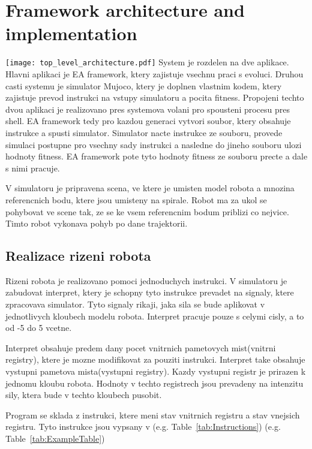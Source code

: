 \documentclass{ExcelAtFIT}
\begin{document}

\section{Framework architecture and implementation}
\label{sec:ArchitectureAndImplementation}
{\texttt{[image: top\_level\_architecture.pdf]}
System je rozdelen na dve aplikace.
Hlavni aplikaci je EA framework, ktery zajistuje vsechnu praci s evoluci.
Druhou casti systemu je simulator Mujoco, ktery je doplnen vlastnim kodem, ktery zajistuje prevod instrukci na vstupy simulatoru a pocita fitness.
Propojeni techto dvou aplikaci je realizovano pres systemova volani pro spousteni procesu pres shell.
EA framework tedy pro kazdou generaci vytvori soubor, ktery obsahuje instrukce a spusti simulator.
Simulator nacte instrukce ze souboru, provede simulaci postupne pro vsechny sady instrukci a nasledne do jineho souboru ulozi hodnoty fitness.
EA framework pote tyto hodnoty fitness ze souboru precte a dale s nimi pracuje.

V simulatoru je pripravena scena, ve ktere je umisten model robota a mnozina referencnich bodu, ktere jsou umisteny na spirale.
Robot ma za ukol se pohybovat ve scene tak, ze se ke vsem referencnim bodum priblizi co nejvice.
Timto robot vykonava pohyb po dane trajektorii.

\subsection{Realizace rizeni robota}
Rizeni robota je realizovano pomoci jednoduchych instrukci.
V simulatoru je zabudovat interpret, ktery je schopny tyto instrukce prevadet na signaly, ktere zpracovava simulator.
Tyto signaly rikaji, jaka sila se bude aplikovat v jednotlivych kloubech modelu robota.
Interpret pracuje pouze s celymi cisly, a to od -5 do 5 vcetne.

Interpret obsahuje predem dany pocet vnitrnich pametovych mist(vnitrni registry), ktere je mozne modifikovat za pouziti instrukci.
Interpret take obsahuje vystupni pametova mista(vystupni registry).
Kazdy vystupni registr je prirazen k jednomu kloubu robota.
Hodnoty v techto registrech jsou prevadeny na intenzitu sily, ktera bude v techto kloubech pusobit.

Program se sklada z instrukci, ktere meni stav vnitrnich registru a stav vnejsich registru.
Tyto instrukce jsou vypsany v (e.g. Table~\ref{tab:Instructions}) (e.g. Table~\ref{tab:ExampleTable})

}
\end{document}
